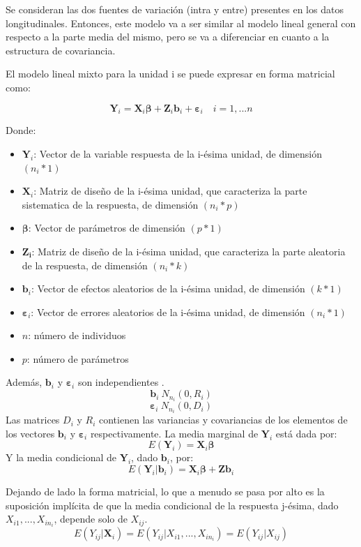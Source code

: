 \documentclass[12pt]{article}
\def\xseqn{$X_{i1}, ..., X_{in_i}$}
\begin{document}
Se consideran las dos fuentes de variación (intra y entre) presentes en los datos longitudinales. Entonces, este modelo va 
a ser similar al modelo lineal general con respecto a la parte media del mismo, pero se va a diferenciar en cuanto a la 
estructura de covariancia.

El modelo lineal mixto para la unidad i se puede expresar en forma matricial como:

\begin{equation}
	\bm{Y}_i = \bm{X}_i\bm{\beta} + \bm{Z}_i\bm{b}_i + \bm{\varepsilon}_i \quad i = 1, ... n
\end{equation}

Donde:
\begin{itemize}
	\item $\bm{Y}_i$: Vector de la variable respuesta de la i-ésima unidad, de dimensión $(n_i*1)$
	\item $\bm{X}_i$: Matriz de diseño de la i-ésima unidad, que caracteriza la parte sistematica de la respuesta, 
	de dimensión $(n_i*p)$
	\item $\bm{\beta}$: Vector de parámetros de dimensión $(p*1)$
	\item $\bm{Z_i}$: Matriz de diseño de la i-ésima unidad, que caracteriza la parte aleatoria de la respuesta, 
	de dimensión $(n_i*k)$
	\item $\bm{b}_i$: Vector de efectos aleatorios de la i-ésima unidad, de dimensión $(k*1)$
	\item $\bm{\varepsilon}_i$: Vector de errores aleatorios de la i-ésima unidad, de dimensión $(n_i*1)$
	\item $n$: número de individuos
	\item $p$: número de parámetros
\end{itemize}
Además, $\bm{b}_i$ y $\bm{\varepsilon}_i$ son independientes .
\[ \bm{b}_i ~ N_{n_i}(0, R_i) \]
\[ \bm{\varepsilon}_i ~ N_{n_i}(0, D_i) \]
Las matrices $D_i$ y $R_i$ contienen las variancias y covariancias de los elementos de los vectores 
$\bm{b}_i$ y $\bm{\varepsilon}_i$ respectivamente.
La media marginal de $\bm{Y}_i$ está dada por:
\begin{equation}
	E(\bm{Y}_i) = \bm{X}_i\bm{\beta}
\end{equation}
Y la media condicional de $\bm{Y}_i$, dado $\bm{b}_i$, por:
\begin{equation}
	E(\bm{Y}_i|\bm{b}_i) = \bm{X}_i\bm{\beta} + \bm{Z}\bm{b}_i
\end{equation}

Dejando de lado la forma matricial, lo que a menudo se pasa por alto es la suposición implícita de que la media 
condicional de la respuesta j-ésima, dado \xseqn, depende solo de $X_{ij}$.
\begin{equation}
\label{esperanza}
	E(Y_{ij}|\bm{X}_i) = E(Y_{ij}|X_{i1}, ..., X_{in_i}) = E(Y_{ij}|X_{ij})
\end{equation}
\end{document}
